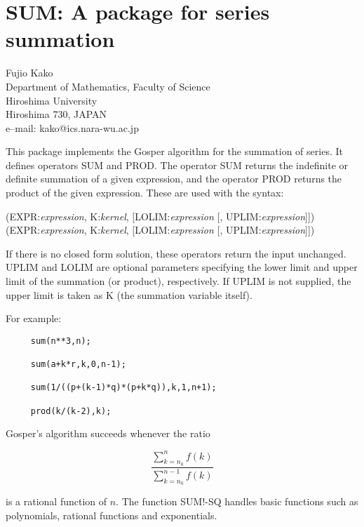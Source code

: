 \chapter{SUM: A package for series summation}
\label{SUM}

{\footnotesize
\begin{center}
Fujio Kako \\ 
Department of Mathematics, Faculty of Science \\
Hiroshima University \\ 
Hiroshima 730, JAPAN \\[0.05in]
e--mail: kako@ics.nara-wu.ac.jp
\end{center}
}

This package implements the Gosper algorithm for the summation of series.
It defines operators SUM and PROD.  The operator SUM returns the indefinite
or definite summation of a given expression, and the operator PROD returns
the product of the given expression.  These are used with the syntax:

\vspace{.1in}
(EXPR:{\em expression}, K:{\em kernel},
[LOLIM:{\em expression} [, UPLIM:{\em expression}]]) \\
(EXPR:{\em expression}, K:{\em kernel},
[LOLIM:{\em expression} [, UPLIM:{\em expression}]])

If there is no closed form solution, these operators return the input
unchanged.  UPLIM and LOLIM are optional parameters specifying the lower
limit and upper limit of the summation (or product), respectively.  If UPLIM
is not supplied, the upper limit is taken as K (the summation variable
itself).

For example:

\begin{verbatim}
     sum(n**3,n);

     sum(a+k*r,k,0,n-1);

     sum(1/((p+(k-1)*q)*(p+k*q)),k,1,n+1);

     prod(k/(k-2),k);
\end{verbatim}

Gosper's algorithm succeeds whenever the ratio

\[ \frac{\sum_{k=n_0}^n f(k)}{\sum_{k=n_0}^{n-1} f(k)} \]

\noindent is a rational function of $n$.  The function SUM!-SQ
handles basic functions such as polynomials, rational functions and
exponentials.

